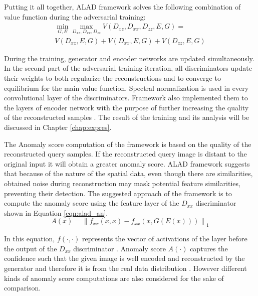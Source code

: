 {Putting it all together, ALAD framework solves the following combination of value function during the adversarial
training:
\begin{equation}
\begin{array}{l}{\min _{G, E} \max _{D_{x z}, D_{x x}, D_{z z}} V\left(D_{x z}, D_{x x}, D_{z z}, E, G\right)=} \\ {V\left(D_{x z}, E, G\right)+V\left(D_{x x}, E, G\right)+V\left(D_{z z}, E, G\right)}\end{array} 
\end{equation}

During the training, generator and encoder networks are updated simultaneously. In the
second part of the adversarial training iteration, all discriminators update their weights to both
regularize the reconstructions and to converge to equilibrium for the main value function. Spectral
normalization is used in every convolutional layer of the discriminators. Framework also implemented
them to the layers of encoder network with the purpose of further increasing the quality of the reconstructed
samples \cite{DBLP:journals/corr/abs-1812-02288}. The result of the training and its analysis will 
be discussed in Chapter \ref{chap:expres}.

The Anomaly score computation of the framework is based on the quality of the reconstructed query
samples. If the reconstructed query image is distant to the original input it will obtain a greater
anomaly score. ALAD framework suggests that because of the nature of the spatial data, even though
there are similarities, obtained noise during reconstruction may mask potential feature
similarities, preventing their detection. The suggested approach of the framework is to compute the
anomaly score using the feature layer of the $D_{xx}$ discriminator shown in Equation
\ref{eqn:alad_an}.
\begin{equation}
  \label{eqn:alad_an}
  A(x)=\left\|f_{x x}(x, x)-f_{x x}(x, G(E(x)))\right\|_{1} 
\end{equation}

In this equation, $f(\cdot, \cdot)$ represents the vector of activations of the layer before the
output of the $D_{xx}$ discriminator \cite{DBLP:journals/corr/abs-1812-02288}. Anomaly score
$A(\cdot)$ captures the confidence such that the given image is well encoded and reconstructed by
the generator and therefore it is from the real data distribution
\cite{DBLP:journals/corr/abs-1812-02288}. However different kinds of anomaly score computations are
also considered for the sake of comparison. 

}

